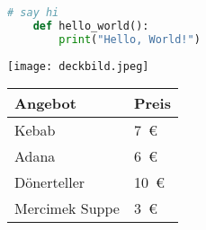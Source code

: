 
\begin{lstlisting}[language=python]
    # say hi
    def hello_world():
        print("Hello, World!")
\end{lstlisting}


\texttt{[image: deckbild.jpeg]}\\%


\begin{table}[h]
  \small
  \begin{tabular}{|P{4cm}|P{3cm}|}%
    \hline
    \textbf{Angebot} & \textbf{Preis} \\%
    \hline
    Kebab & 7 € \\%
    \hline
    Adana & 6 € \\
    \hline %
    Dönerteller & 10 € \\
    \hline
    Mercimek Suppe & 3 € \\
    \hline
  \end{tabular}\\
\end{table}